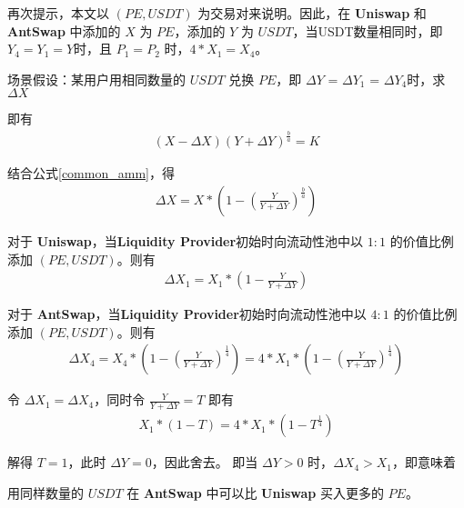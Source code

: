 \documentclass{article}
\begin{document}
再次提示，本文以 $(PE, USDT)$ 为交易对来说明。因此，在 \textbf{Uniswap} 和 \textbf{AntSwap} 中添加的 $X$ 为 $PE$，添加的 $Y$ 为 $USDT$，当USDT数量相同时，即 $Y_4 = Y_1 = Y$时，且 $P_1 = P_2$ 时，$4 * X_1 = X_4$。

场景假设：某用户用相同数量的 $USDT$ 兑换 $PE$，即 $\Delta Y$ = $\Delta Y_1$ = $\Delta Y_4$时，求 $\Delta X$

即有
\begin{equation*}
\begin{split}
(X - \Delta X)(Y + \Delta Y)^\frac{b}{a} = K
\end{split}
\end{equation*}

结合公式\ref{common_amm}，得
\begin{equation*}
\begin{split}
\Delta X = X * (1 - (\frac{Y}{Y+\Delta Y})^\frac{b}{a})
\end{split}
\end{equation*}

对于 \textbf{Uniswap}，当\textbf{Liquidity Provider}初始时向流动性池中以 $1:1$ 的价值比例添加 $(PE, USDT)$。则有
\begin{equation*}
\begin{split}
\Delta X_1 = X_1 * (1 - \frac{Y}{Y+\Delta Y})
\end{split}
\end{equation*}

对于 \textbf{AntSwap}，当\textbf{Liquidity Provider}初始时向流动性池中以 $4:1$ 的价值比例添加 $(PE, USDT)$。则有
\begin{equation*}
\begin{split}
\Delta X_4 = X_4 * (1 - (\frac{Y}{Y+\Delta Y})^\frac{1}{4}) = 4 * X_1 * (1 - (\frac{Y}{Y+\Delta Y})^\frac{1}{4})
\end{split}
\end{equation*}

令 $\Delta X_1 = \Delta X_4$，同时令 $\frac{Y}{Y+\Delta Y} = T$ 即有
\begin{equation*}
\begin{split}
X_1 * (1 - T) = 4 * X_1 * (1 - T^\frac{1}{4})
\end{split}
\end{equation*}

解得 $T = 1$，此时 $\Delta Y = 0$，因此舍去。
即当 $\Delta Y > 0$ 时，$\Delta X_4 > X_1$，即意味着

用同样数量的 $USDT$ 在 \textbf{AntSwap} 中可以比 \textbf{Uniswap} 买入更多的 $PE$。
\end{document}

